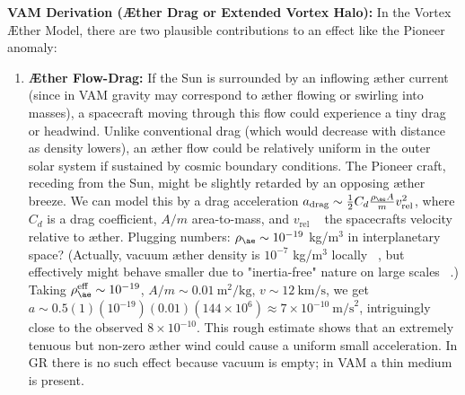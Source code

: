 \documentclass[a4paper, aps,preprint,superscriptaddress, 12pt]{revtex4}
\begin{document}
\textbf{VAM Derivation (Æther Drag or Extended Vortex Halo):} In the Vortex Æther Model, there are two plausible contributions to an effect like the Pioneer anomaly:


\begin{enumerate}

\item
\textbf{Æther Flow-Drag:} If the Sun is surrounded by an inflowing æther current (since in VAM gravity may correspond to æther flowing or swirling into masses), a spacecraft moving through this flow could experience a tiny drag or headwind. Unlike conventional drag (which would decrease with distance as density lowers), an æther flow could be relatively uniform in the outer solar system if sustained by cosmic boundary conditions. The Pioneer craft, receding from the Sun, might be slightly retarded by an opposing æther breeze. We can model this by a drag acceleration $a_{\text{drag}} \sim \frac{1}{2}C_d \frac{\rho_{\ae} A}{m} v_{\text{rel}}^2$, where $C_d$ is a drag coefficient, $A/m$ area-to-mass, and $v_{\text{rel}}$ ~ the spacecraft\rqs s velocity relative to æther. Plugging numbers: $\rho_{\ae}\sim10^{-19}$ kg/m$^3$ in interplanetary space? (Actually, vacuum æther density is $10^{-7}$ kg/m$^3$ locally~\cite{VAM_constants} , but effectively might behave smaller due to "inertia-free" nature on large scales~\cite{Iskandarani2025b} .) Taking $\rho_{\ae}^{\text{eff}}\sim10^{-19}$, $A/m\sim0.01~\text{m}^2/\text{kg}$, $v\sim12~\text{km/s}$, we get $a\sim0.5(1)(10^{-19})(0.01)(144\times10^6) \approx7\times10^{-10}~\text{m/s}^2$, intriguingly close to the observed $8\times10^{-10}$. This rough estimate shows that an extremely tenuous but non-zero æther wind could cause a uniform small acceleration. In GR there is no such effect because vacuum is empty; in VAM a thin medium is present.





\end{enumerate}
\end{document}
